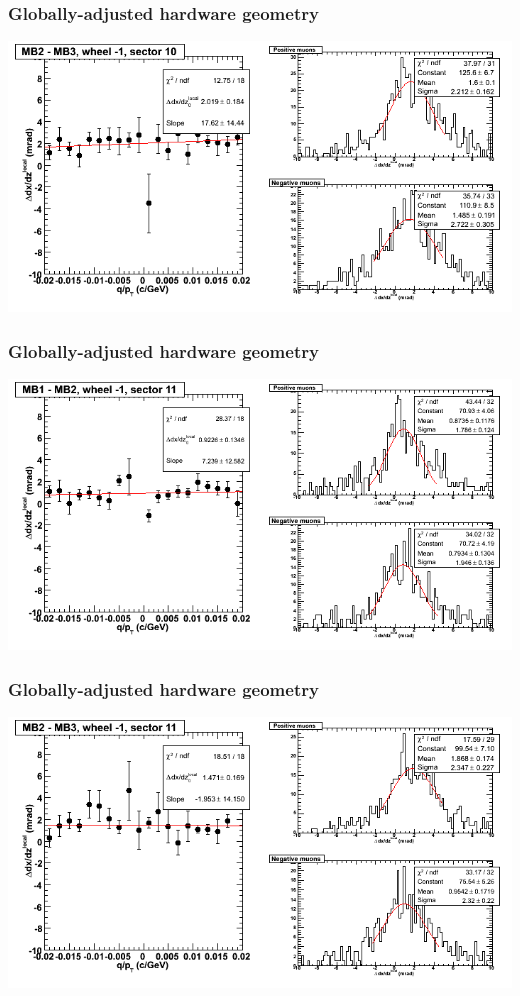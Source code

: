 \documentclass[compress]{beamer}
\begin{document}
\begin{frame}
\frametitle{Globally-adjusted hardware geometry}
\includegraphics[width=\linewidth]{NOV4_segdiffs_HW/dt13_slope_B_10_23.png}
\end{frame}

\begin{frame}
\frametitle{Globally-adjusted hardware geometry}
\includegraphics[width=\linewidth]{NOV4_segdiffs_HW/dt13_slope_B_11_12.png}
\end{frame}

\begin{frame}
\frametitle{Globally-adjusted hardware geometry}
\includegraphics[width=\linewidth]{NOV4_segdiffs_HW/dt13_slope_B_11_23.png}
\end{frame}
\end{document}
